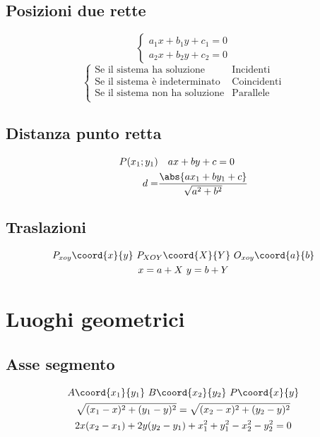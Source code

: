 \section{Posizioni due rette}
\begin{equation*}
\begin{cases}
a_1x+b_1y+c_1=0\\
a_2x+b_2y+c_2=0
\end{cases}
\end{equation*}
\begin{equation*}
\begin{cases}
\text{Se il sistema ha soluzione}& \text{Incidenti}\\
\text{Se il sistema è indeterminato}& \text{Coincidenti}\\
\text{Se il sistema non ha soluzione}& \text{Parallele}\\
\end{cases}
\end{equation*}
\section{Distanza punto retta}
\begin{align*}
P(x_1;y_1)&\quad ax+by+c=0\\
d=&\dfrac{\abs{ax_1+by_1+c}}{\sqrt{a^2+b^2}}
\end{align*}
\section{Traslazioni}
\begin{gather*}
 P_{xoy}\coord{x}{y}\ P_{XOY}\coord{X}{Y}\ O_{xoy}\coord{a}{b}\notag\\  x=a+X\  y=b+Y
\end{gather*}
\chapter{Luoghi geometrici}
\section{Asse segmento}
\begin{gather*}
A\coord{x_1}{y_1}\ B\coord{x_2}{y_2}\ P\coord{x}{y}\notag\\
\sqrt{(x_1-x)^2+(y_1-y)^2}=\sqrt{(x_2-x)^2+(y_2-y)^2}\\
2x(x_2-x_1)+2y(y_2-y_1)+x_1^2+y_1^2-x_2^2-y_2^2=0\\		
\end{gather*}
